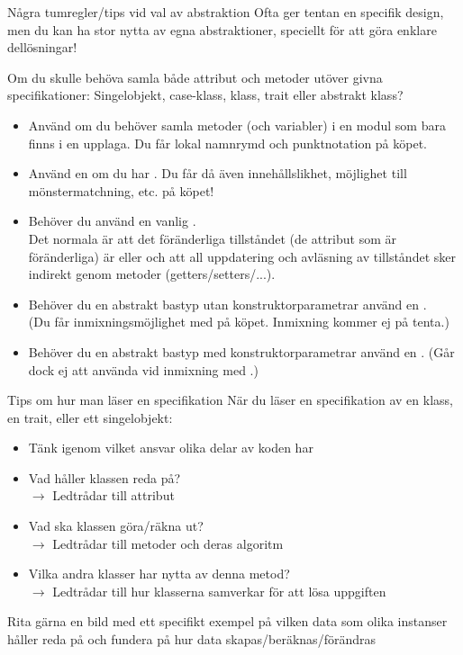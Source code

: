 \begin{Slide}{Några tumregler/tips vid val av abstraktion}\SlideFontSmall
Ofta ger tentan en specifik design, men du kan ha stor nytta av egna abstraktioner, speciellt  för att göra enklare dellösningar!

\pause\vspace{1em}Om du skulle behöva samla både attribut och metoder utöver givna specifikationer:
Singelobjekt, case-klass, klass, trait eller abstrakt klass?
\begin{itemize}\SlideFontTiny
\item Använd  om du behöver samla metoder (och variabler) i en modul som bara finns i en upplaga. Du får lokal namnrymd och punktnotation på köpet.
\item Använd en  om du har . Du får då även innehållslikhet, möjlighet till mönstermatchning, etc. på köpet!
\item Behöver du   använd en vanlig .\\ Det normala är att det föränderliga tillståndet (de attribut som är föränderliga) är  eller  och att all uppdatering och avläsning av tillståndet sker indirekt genom metoder (getters/setters/...).
\item Behöver du en abstrakt bastyp utan konstruktorparametrar använd en . \\(Du får inmixningsmöjlighet med  på köpet. Inmixning kommer ej på tenta.)
\item Behöver du en abstrakt bastyp med konstruktorparametrar använd en . (Går dock ej att använda vid inmixning med .)
\end{itemize}
\end{Slide}


\begin{Slide}{Tips om hur man läser en specifikation}\SlideFontSmall
När du läser en specifikation av en klass, en trait, eller ett singelobjekt:
\begin{itemize}
\item Tänk igenom vilket ansvar olika delar av koden har
\item Vad håller klassen reda på? \\$\rightarrow$ Ledtrådar till attribut
\item Vad ska klassen göra/räkna ut? \\$\rightarrow$ Ledtrådar till metoder och deras algoritm
\item Vilka andra klasser har nytta av denna metod? \\$\rightarrow$ Ledtrådar till hur klasserna samverkar för att lösa uppgiften
\end{itemize}
Rita gärna en bild med ett specifikt exempel på vilken data som olika instanser håller reda på och fundera på hur data skapas/beräknas/förändras
\end{Slide}


